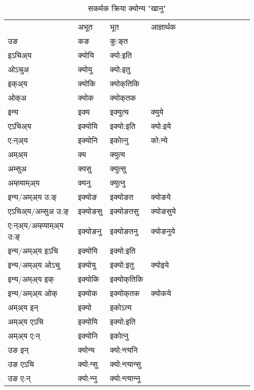 \begin{table}[H]
\centering
\caption{\label{a.vt} सकर्मक क्रिया  क्योन्य  "खानु"  }
\begin{tabular}{l|l|l|l|l|l|l|l|l|l|l|l|l}  \toprule
&अभूत & भूत & आज्ञार्थक \\ 
उङ &कङ &कु:ङ्‌त \\ 
इऽचिअ्य &क्योयि &क्यो:इति   \\ 
ओऽचुअ &क्योयु &क्यो:इतु   \\ 
इक्अ्य &क्योकि &क्योक्‌तिकि   \\ 
ओक्अ &क्योक &क्योक्‌तक   \\ 
इन्य & इक्य & इक्युत्य &क्युये  \\ 
एऽचिअ्य & इक्योयि & इक्यो:इति &क्यो:इये    \\ 
ए:न्अ्य & इक्योनि  & इकोत्‍नु &को:न्ये  \\ 
अम्अ्य & क्य & क्युत्य   \\ 
अम्सुअ & क्यसु & क्युत्सु     \\ 
अम्ह्‍याम्अ्य & क्यनु  & क्युत्‍नु \\ 
\midrule
इन्य/अम्अ्य उ:ङ्‌&इक्योङ &इक्योङत &क्योङये \\ 
एऽचिअ्य/अम्सुअ उ:ङ्‌ &इक्योङसु &इक्योङतसु &क्योङसुये \\ 
ए:न्अ्य/अम्ह्‍याम्अ्य उ:ङ्‌ &इक्योङनु &इक्योङतनु &क्योङनुये \\ 
इन्य/अम्अ्य इऽचि &इक्योयि &इक्यो:इति    \\ 
इन्य/अम्अ्य ओऽचु &इक्योयु &इक्यो:इतु  &क्योइये  \\ 
इन्य/अम्अ्य इक् &इक्योकि &इक्योक्‌तिकि   \\ 
इन्य/अम्अ्य ओक् &इक्योक &इक्योक्‌तक  &क्योकये  \\ 
अम्अ्य इन् & इक्यो & इकोऽत्य   \\ 
अम्अ्य एऽचि & इक्योयि & इक्यो:इति     \\ 
अम्अ्य ए:न् & इक्योनि  & इकोत्‍नु  \\ 
\midrule
उङ इन् & क्योन्य  & क्यो:न्त्यनि  \\ 
उङ एऽचि & क्यो:न्सु  & क्यो:न्त्यान्सु   \\ 
उङ ए:न्& क्यो:न्‍नु  & क्यो:न्त्यान्‍नु   \\ 
\bottomrule
\end{tabular}
\end{table}


